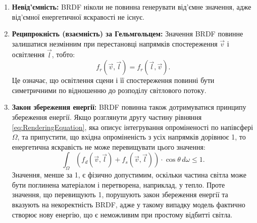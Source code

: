 \begin{enumerate}
    \item \textbf{Невід’ємність:} BRDF ніколи не повинна генерувати від'ємне зна\-чен\-ня, адже від'ємної енергетичної яскравості не існує.

    \item \textbf{Реципрокність (взаємність) за Гельмгольцем:} Зна\-чен\-ня BRDF повинне залишатися незмінним при перестановці 
    напрямків спостереження $\vec{v}$ і освітлення $\vec{l}$, тобто:
    \[
    f_r(\vec{v}, \vec{l}) = f_r(\vec{l}, \vec{v}).
    \]
    Це означає, що освітлення сцени і її спостереження повинні бути симетричними по відношенню до розподілу світлового потоку.

    \item \textbf{Закон збереження енергії:} BRDF повинна також дотримуватися принципу збереження енергії. Якщо розглянути другу частину рів\-нян\-ня 
    \ref{eq:RenderingEquation}, яка описує інтегрування опроміненості по напівсфері $\Omega$, та припустити, що вхідна опроміненість з усіх напрямків дорівнює 1, 
    то енергетична яскравість не може перевищувати цього зна\-чен\-ня:
    \[
    \int_{\Omega} (f_d(\vec{v}, \vec{l}) + f_s(\vec{v}, \vec{l})) \cdot\cos\theta \, d\omega \leq 1.
    \]
    Значення, менше за 1, є фізично допустимим, оскільки частина світ\-ла може бути поглинена матеріалом і перетворена, наприклад, у теп\-ло. 
    Проте значення, що перевищують 1, порушують закон збереження енергії та вказують на некоректність BRDF, адже у такому випадку модель фактично створює нову 
    енергію, що є неможливим при прос\-то\-му відбитті світла.
\end{enumerate}